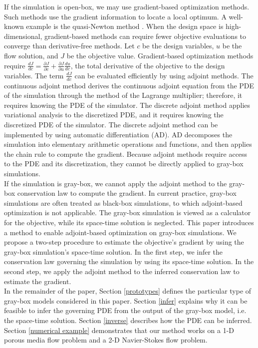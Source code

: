 \documentclass{paper1}
\begin{document}
If the simulation is open-box, we may use gradient-based optimization methods.
Such methods use the gradient information to locate a local optimum.
A well-known example is the quasi-Newton method \cite{quasiNewton}. 
When the design space is high-dimensional, gradient-based methods can require fewer
objective evaluations to converge than derivative-free methods.
Let $c$ be the design variables, $u$ be the flow solution, and $J$ be the objective value.
Gradient-based optimization methods require $\frac{d J}{d c} = \frac{\partial J}{\partial c} + \frac{\partial J}{\partial u}
\frac{d u}{d c}$, the total derivative of the objective to the design variables. 
The term $\frac{dJ}{dc}$ can be evaluated efficiently by using adjoint methods.
The continuous adjoint method derives the continuous adjoint equation from the PDE of the simulation through the
method of the Lagrange multiplier; therefore, it requires knowing the PDE of the simulator. 
The discrete adjoint method applies variational analysis to the discretized PDE, and it requires knowing the
discretized PDE of the simulator.
The discrete adjoint method can be implemented by using automatic differentiation (AD).
AD decomposes the simulation into elementary arithmetic operations and functions, and
then applies the chain
rule to compute the gradient.
Because adjoint methods require access to the PDE and its discretization, they cannot be directly
applied to gray-box simulations.\\

If the simulation is gray-box, we cannot apply the adjoint method to the gray-box conservation law
to compute the gradient. In current practice, gray-box simulations are often treated as black-box simulations, to which 
adjoint-based optimization is not applicable.
The gray-box simulation is viewed as a calculator for the objective, while its space-time solution is neglected.
This paper introduces a method to enable adjoint-based optimization on gray-box simulations. We propose
a two-step procedure to estimate the objective's gradient by using the gray-box simulation's space-time solution.
In the first step, we infer the conservation law governing the simulation by using its space-time solution. In
the second step, we apply the adjoint method to the inferred conservation law to estimate the gradient.\\


In the remainder of the paper, Section \ref{prototypes} defines the particular type of
gray-box models considered in this paper. Section \ref{infer} explains why it can be feasible to
infer the governing PDE from the output of the gray-box model, i.e. the space-time solution.
Section \ref{inverse} describes how the PDE can be inferred. 
Section \ref{numerical example} demonstrates that our method works on a 1-D porous media flow problem and
a 2-D Navier-Stokes flow problem.
\end{document}
